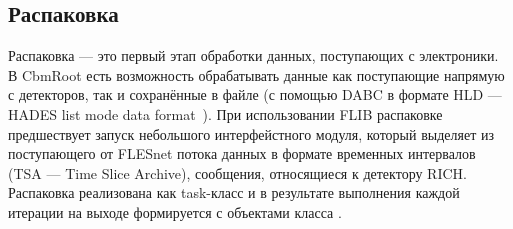 
\subsection{Распаковка}

Распаковка --- это первый этап обработки данных, поступающих с электроники. В CbmRoot есть возможность обрабатывать данные как поступающие напрямую с детекторов, так и сохранённые в файле (с помощью DABC в формате HLD --- HADES list mode data format~\cite{HLD}). При использовании FLIB распаковке предшествует запуск небольшого интерфейстного модуля, который выделяет из поступающего от FLESnet потока данных в формате временных интервалов (TSA --- Time Slice Archive), сообщения, относящиеся к детектору RICH. Распаковка реализована как task-класс  и в результате выполнения каждой итерации на выходе формируется  с объектами класса .

